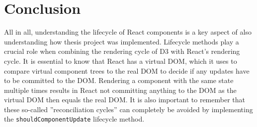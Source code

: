 \section{Conclusion}

All in all, understanding the lifecycle of React components is a key aspect of also understanding how thesis project was implemented. Lifecycle methods play a crucial role when combining the rendering cycle of D3 with React's rendering cycle. It is essential to know that React has a virtual DOM, which it uses to compare virtual component trees to the real DOM to decide if any updates have to be committed to the DOM. Rendering a component with the same state multiple times results in React not committing anything to the DOM as the virtual DOM then equals the real DOM. It is also important to remember that these so-called ''reconciliation cycles'' can completely be avoided by implementing the \texttt{shouldComponentUpdate} lifecycle method.






